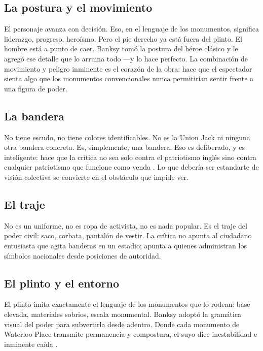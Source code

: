 \documentclass[12pt, a4paper]{article}
\begin{document}
\subsection*{La postura y el movimiento}

El personaje avanza con decisión. Eso, en el lenguaje de los monumentos, significa liderazgo, progreso, heroísmo. Pero el pie derecho ya está fuera del plinto. El hombre está a punto de caer. Banksy tomó la postura del héroe clásico y le agregó ese detalle que lo arruina todo ---y lo hace perfecto. La combinación de movimiento y peligro inminente es el corazón de la obra: hace que el espectador sienta algo que los monumentos convencionales nunca permitirían sentir frente a una figura de poder.

\subsection*{La bandera}

No tiene escudo, no tiene colores identificables. No es la Union Jack ni ninguna otra bandera concreta. Es, simplemente, una bandera. Eso es deliberado, y es inteligente: hace que la crítica no sea solo contra el patriotismo inglés sino contra cualquier patriotismo que funcione como venda \cite{cnn2026}. Lo que debería ser estandarte de visión colectiva se convierte en el obstáculo que impide ver.

\subsection*{El traje}

No es un uniforme, no es ropa de activista, no es nada popular. Es el traje del poder civil: saco, corbata, pantalón de vestir. La crítica no apunta al ciudadano entusiasta que agita banderas en un estadio; apunta a quienes administran los símbolos nacionales desde posiciones de autoridad.

\subsection*{El plinto y el entorno}

El plinto imita exactamente el lenguaje de los monumentos que lo rodean: base elevada, materiales sobrios, escala monumental. Banksy adoptó la gramática visual del poder para subvertirla desde adentro. Donde cada monumento de Waterloo Place transmite permanencia y compostura, el suyo dice inestabilidad e inminente caída \cite{myartbroker2026}.
\end{document}
